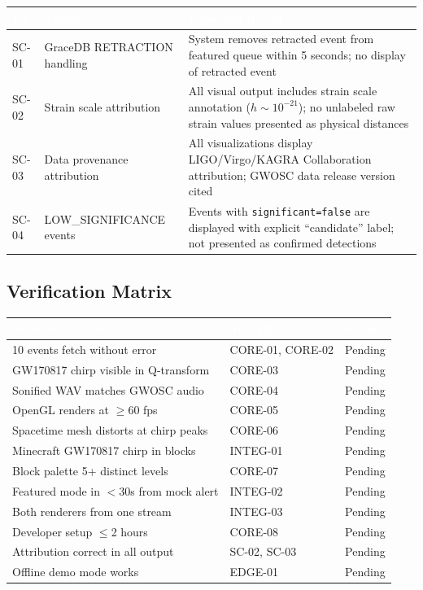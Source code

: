 \documentclass[11pt,letterpaper]{article}
\newcommand{\tableheader}[1]{\textbf{\sffamily\textcolor{white}{#1}}}
\begin{document}
\begin{center}
\begin{tabularx}{\textwidth}{L{1.5cm}L{4cm}X}
\toprule
{}
\tableheader{ID} & \tableheader{Verifies} & \tableheader{Expected Result} \\
\midrule
SC-01 & GraceDB RETRACTION handling & System removes retracted event from featured queue within 5 seconds; no display of retracted event \\
SC-02 & Strain scale attribution & All visual output includes strain scale annotation ($h \sim 10^{-21}$); no unlabeled raw strain values presented as physical distances \\
SC-03 & Data provenance attribution & All visualizations display LIGO/Virgo/KAGRA Collaboration attribution; GWOSC data release version cited \\
SC-04 & LOW\_SIGNIFICANCE events & Events with \texttt{significant=false} are displayed with explicit ``candidate'' label; not presented as confirmed detections \\
\bottomrule
\end{tabularx}
\end{center}

\subsection{Verification Matrix}

\begin{center}
\begin{tabularx}{\textwidth}{L{5cm}L{3cm}C{2cm}}
\toprule
{}
\tableheader{Success Criterion} & \tableheader{Test IDs} & \tableheader{Status} \\
 events fetch without error & CORE-01, CORE-02 & Pending \\
GW170817 chirp visible in Q-transform & CORE-03 & Pending \\
Sonified WAV matches GWOSC audio & CORE-04 & Pending \\
OpenGL renders at $\geq$60 fps & CORE-05 & Pending \\
Spacetime mesh distorts at chirp peaks & CORE-06 & Pending \\
Minecraft GW170817 chirp in blocks & INTEG-01 & Pending \\
Block palette 5+ distinct levels & CORE-07 & Pending \\
Featured mode in $<$30s from mock alert & INTEG-02 & Pending \\
Both renderers from one stream & INTEG-03 & Pending \\
Developer setup $\leq$2 hours & CORE-08 & Pending \\
Attribution correct in all output & SC-02, SC-03 & Pending \\
Offline demo mode works & EDGE-01 & Pending \\
\bottomrule
\end{tabularx}
\end{center}
\end{document}
